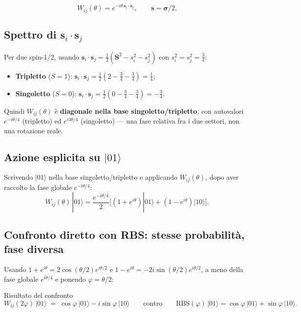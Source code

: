 \documentclass[11pt,a4paper]{article}
\begin{document}
$$W_{ij}(\theta)=e^{-i\theta\,\mathbf s_i\cdot\mathbf s_j}, \qquad \mathbf s=\boldsymbol\sigma/2.$$

\subsection*{Spettro di $\mathbf s_i\cdot\mathbf s_j$}

Per due spin-1/2, usando
$\mathbf s_i\cdot\mathbf s_j=\tfrac12(\mathbf S^2-s_i^2-s_j^2)$ con
$s_i^2=s_j^2=\tfrac34$:
\begin{itemize}[leftmargin=1.3em,itemsep=0.1em]
\item \textbf{Tripletto} ($S=1$): $\mathbf s_i\cdot\mathbf s_j=\tfrac12(2-\tfrac34-\tfrac34)=\tfrac14$;
\item \textbf{Singoletto} ($S=0$): $\mathbf s_i\cdot\mathbf s_j=\tfrac12(0-\tfrac34-\tfrac34)=-\tfrac34$.
\end{itemize}
Quindi $W_{ij}(\theta)$ è \textbf{diagonale nella base
singoletto/tripletto}, con autovalori $e^{-i\theta/4}$ (tripletto) ed
$e^{i3\theta/4}$ (singoletto) --- una fase relativa fra i due settori,
non una rotazione reale.

\subsection*{Azione esplicita su $|01\rangle$}

Scrivendo $|01\rangle$ nella base singoletto/tripletto e applicando
$W_{ij}(\theta)$, dopo aver raccolto la fase globale $e^{-i\theta/4}$:
$$W_{ij}(\theta)\,|01\rangle=\frac{e^{-i\theta/4}}{2}\Big[(1+e^{i\theta})|01\rangle+(1-e^{i\theta})|10\rangle\Big].$$

\subsection*{Confronto diretto con RBS: stesse probabilità, fase diversa}

Usando $1+e^{i\theta}=2\cos(\theta/2)e^{i\theta/2}$ e
$1-e^{i\theta}=-2i\sin(\theta/2)e^{i\theta/2}$, a meno della fase
globale $e^{i\theta/4}$ e ponendo $\varphi=\theta/2$:

\begin{okbox}{Risultato del confronto}
$$W_{ij}(2\varphi)\,|01\rangle \;\dot=\; \cos\varphi\,|01\rangle-i\sin\varphi\,|10\rangle
\qquad\text{contro}\qquad
\mathrm{RBS}(\varphi)\,|01\rangle=\cos\varphi\,|01\rangle+\sin\varphi\,|10\rangle.$$
\end{okbox}
\end{document}
